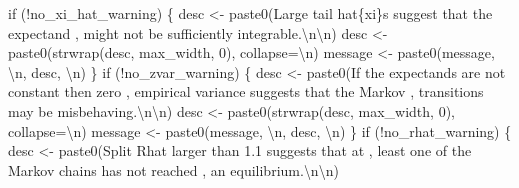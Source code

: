 \documentclass[
  letterpaper,
  DIV=11,
  numbers=noendperiod]{scrartcl}
\newenvironment{Shaded}{\begin{snugshade}}{\end{snugshade}}
\newcommand{\CharTok}[1]{\textcolor[rgb]{0.13,0.47,0.30}{#1}}
\newcommand{\ControlFlowTok}[1]{\textcolor[rgb]{0.00,0.23,0.31}{#1}}
\newcommand{\DecValTok}[1]{\textcolor[rgb]{0.68,0.00,0.00}{#1}}
\newcommand{\NormalTok}[1]{\textcolor[rgb]{0.00,0.23,0.31}{#1}}
\newcommand{\OperatorTok}[1]{\textcolor[rgb]{0.37,0.37,0.37}{#1}}
\newcommand{\SpecialCharTok}[1]{\textcolor[rgb]{0.37,0.37,0.37}{#1}}
\newcommand{\StringTok}[1]{\textcolor[rgb]{0.13,0.47,0.30}{#1}}
\begin{document}
\begin{Shaded}
\begin{Highlighting}[]
  \ControlFlowTok{if}\NormalTok{ (}\OperatorTok{!}\NormalTok{no\_xi\_hat\_warning) \{}
\NormalTok{    desc }\OperatorTok{\textless{}{-}}\NormalTok{ paste0(}\StringTok{\textquotesingle{}Large tail hat}\SpecialCharTok{\{xi\}}\StringTok{s suggest that the expectand \textquotesingle{}}\NormalTok{,}
                   \StringTok{\textquotesingle{} might not be sufficiently integrable.}\CharTok{\textbackslash{}n\textbackslash{}n}\StringTok{\textquotesingle{}}\NormalTok{)}
\NormalTok{    desc }\OperatorTok{\textless{}{-}}\NormalTok{ paste0(strwrap(desc, max\_width, }\DecValTok{0}\NormalTok{), collapse}\OperatorTok{=}\StringTok{\textquotesingle{}}\CharTok{\textbackslash{}n}\StringTok{\textquotesingle{}}\NormalTok{)}
\NormalTok{    message }\OperatorTok{\textless{}{-}}\NormalTok{ paste0(message, }\StringTok{\textquotesingle{}}\CharTok{\textbackslash{}n}\StringTok{\textquotesingle{}}\NormalTok{, desc, }\StringTok{\textquotesingle{}}\CharTok{\textbackslash{}n}\StringTok{\textquotesingle{}}\NormalTok{)}
\NormalTok{  \}}
  \ControlFlowTok{if}\NormalTok{ (}\OperatorTok{!}\NormalTok{no\_zvar\_warning) \{}
\NormalTok{    desc }\OperatorTok{\textless{}{-}}\NormalTok{ paste0(}\StringTok{\textquotesingle{}If the expectands are not constant then zero \textquotesingle{}}\NormalTok{,}
                   \StringTok{\textquotesingle{}empirical variance suggests that the Markov \textquotesingle{}}\NormalTok{,}
                   \StringTok{\textquotesingle{}transitions may be misbehaving.}\CharTok{\textbackslash{}n\textbackslash{}n}\StringTok{\textquotesingle{}}\NormalTok{)}
\NormalTok{    desc }\OperatorTok{\textless{}{-}}\NormalTok{ paste0(strwrap(desc, max\_width, }\DecValTok{0}\NormalTok{), collapse}\OperatorTok{=}\StringTok{\textquotesingle{}}\CharTok{\textbackslash{}n}\StringTok{\textquotesingle{}}\NormalTok{)}
\NormalTok{    message }\OperatorTok{\textless{}{-}}\NormalTok{ paste0(message, }\StringTok{\textquotesingle{}}\CharTok{\textbackslash{}n}\StringTok{\textquotesingle{}}\NormalTok{, desc, }\StringTok{\textquotesingle{}}\CharTok{\textbackslash{}n}\StringTok{\textquotesingle{}}\NormalTok{)}
\NormalTok{  \}}
  \ControlFlowTok{if}\NormalTok{ (}\OperatorTok{!}\NormalTok{no\_rhat\_warning) \{}
\NormalTok{    desc }\OperatorTok{\textless{}{-}}\NormalTok{ paste0(}\StringTok{\textquotesingle{}Split Rhat larger than 1.1 suggests that at \textquotesingle{}}\NormalTok{,}
                   \StringTok{\textquotesingle{}least one of the Markov chains has not reached \textquotesingle{}}\NormalTok{,}
                   \StringTok{\textquotesingle{}an equilibrium.}\CharTok{\textbackslash{}n\textbackslash{}n}\StringTok{\textquotesingle{}}\NormalTok{)}

\end{Highlighting}
\end{Shaded}
\end{document}
